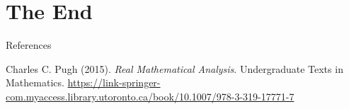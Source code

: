\documentclass [aspectratio=169]{beamer}
\begin{document}
\section{The End}


\begin{frame}{References}

Charles C. Pugh (2015). \textit{Real Mathematical Analysis}. Undergraduate Texts in Mathematics. \href{https://link-springer-com.myaccess.library.utoronto.ca/book/10.1007/978-3-319-17771-7}{https://link-springer-com.myaccess.library.utoronto.ca/book/10.1007/978-3-319-17771-7}

\end{frame}
\end{document}
